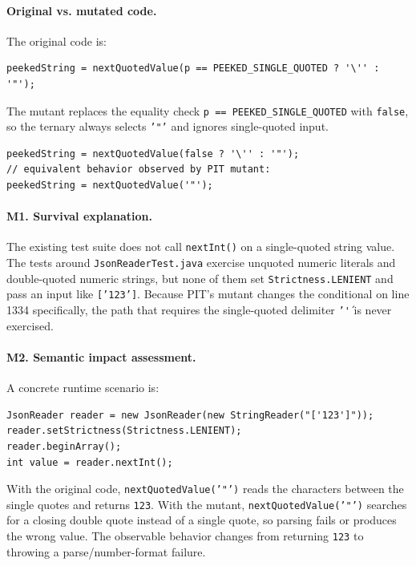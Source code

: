 \documentclass[11pt]{article}
\begin{document}
\paragraph{Original vs. mutated code.}
The original code is:
\begin{lstlisting}[basicstyle=\ttfamily\small,breaklines=true]
peekedString = nextQuotedValue(p == PEEKED_SINGLE_QUOTED ? '\'' : '"');
\end{lstlisting}

The mutant replaces the equality check \texttt{p == PEEKED\_SINGLE\_QUOTED} with \texttt{false}, so the ternary always selects \texttt{'"'} and ignores single-quoted input.

\begin{lstlisting}[basicstyle=\ttfamily\small,breaklines=true]
peekedString = nextQuotedValue(false ? '\'' : '"');
// equivalent behavior observed by PIT mutant:
peekedString = nextQuotedValue('"');
\end{lstlisting}

\paragraph{M1. Survival explanation.}
The existing test suite does not call \texttt{nextInt()} on a single-quoted string value. The tests around \texttt{JsonReaderTest.java} exercise unquoted numeric literals and double-quoted numeric strings, but none of them set \texttt{Strictness.LENIENT} and pass an input like \texttt{['123']}. Because PIT's mutant changes the conditional on line 1334 specifically, the path that requires the single-quoted delimiter \texttt{'\''} is never exercised.

\paragraph{M2. Semantic impact assessment.}
A concrete runtime scenario is:
\begin{lstlisting}[basicstyle=\ttfamily\small,breaklines=true]
JsonReader reader = new JsonReader(new StringReader("['123']"));
reader.setStrictness(Strictness.LENIENT);
reader.beginArray();
int value = reader.nextInt();
\end{lstlisting}

With the original code, \texttt{nextQuotedValue('"')} reads the characters between the single quotes and returns \texttt{123}. With the mutant, \texttt{nextQuotedValue('"')} searches for a closing double quote instead of a single quote, so parsing fails or produces the wrong value. The observable behavior changes from returning \texttt{123} to throwing a parse/number-format failure.
\end{document}
